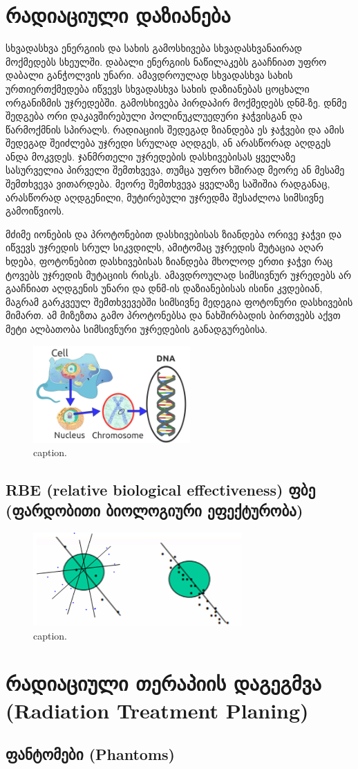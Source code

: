 \documentclass[12pt,a4paper,]{article}
\begin{document}
\section{რადიაციული დაზიანება}
სხვადასხვა ენერგიის და სახის გამოსხივება სხვადასხვანაირად მოქმედებს სხეულში. დაბალი ენერგიის ნაწილაკებს გააჩნიათ უფრო დაბალი განჭოლვის უნარი. ამავდროულად სხვადასხვა სახის ურთიერთქმედება იწვევს სხვადასხვა სახის დაზიანებას ცოცხალი ორგანიზმის უჯრედებში. გამოსხივება პირდაპირ მოქმედებს დნმ-ზე. 
დნმე შედგება ორი დაკავშირებული პოლინუკლუედური ჯაჭვისგან და წარმოქმნის სპირალს. რადიაციის შედეგად ზიანდება ეს ჯაჭვები და ამის შედეგად შეიძლება უჯრედი სრულად აღდგეს, ან არასწორად აღდგეს ანდა მოკვდეს. ჯანმრთელი უჯრედების დასხივებისას ყველაზე სასურველია პირველი შემთხვევა, თუმცა უფრო ხშირად მეორე ან მესამე შემთხვევა ვითარდება. მეორე შემთხვევა ყველაზე საშიშია რადგანაც, არასწორად აღდგენილი, მუტირებული უჯრედმა შესაძლოა სიმსივნე გამოიწვიოს. 

მძიმე იონების და პროტონებით დასხივებისას ზიანდება ორივე ჯაჭვი და იწვევს უჯრედის სრულ სიკვდილს, ამიტომაც უჯრედის მუტაცია აღარ ხდება, ფოტონებით დასხივებისას ზიანდება მხოლოდ ერთი ჯაჭვი რაც ტოვებს უჯრედის მუტაციის რისკს. ამავდროულად სიმსივნურ უჯრედებს არ გააჩნიათ აღდგენის უნარი და დნმ-ის დაზიანებისას ისინი კვდებიან, მაგრამ გარკვეულ შემთხვევებში სიმსივნე მედეგია ფოტონური დასხივების მიმართ. ამ მიზეზთა გამო პროტონებსა და ნახშირბადის ბირთვებს აქვთ მეტი ალბათობა სიმსივნური უჯრედების განადგურებისა.

	\begin{figure}[htp]
	    \centering
        \includegraphics[width = 6cm]{Radiotherapy.jpg}
        \caption{caption.}
        \label{fig:1}
    \end{figure}

    \subsection{RBE (relative biological effectiveness)
 ფბე (ფარდობითი ბიოლოგიური ეფექტურობა) } 

	\begin{figure}[htp]
	    \centering
        \includegraphics[width = 8cm]{Picture1.png}
        \caption{caption.}
        \label{fig:1}
    \end{figure}

\section{რადიაციული თერაპიის დაგეგმვა (Radiation Treatment Planing)}
\subsection{ფანტომები (Phantoms)}

\medskip

\printbibliography
\end{document}

